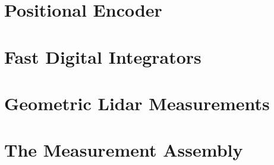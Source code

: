 \section{Positional Encoder}
\section{Fast Digital Integrators}
\section{Geometric Lidar Measurements}
\section{The Measurement Assembly}